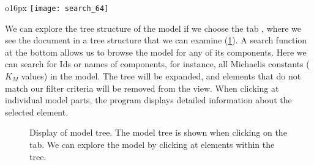 \begin{wrapfigure}{o}{16px}
\texttt{[image: search\_64]}%
\end{wrapfigure}
We can explore the tree structure of the model if we choose the tab , where we see the \SBML document in a tree structure that we can examine (\cref{fig:modelTree}).
A search function at the bottom allows us to browse the model for any of its components.
Here we can search for \acp{Id} or names of components, for instance, all Michaelis constants ($K_M$ values) in the model.
The tree will be expanded, and elements that do not match our filter criteria will be removed from the view.
When clicking at individual model parts, the program displays detailed information about the selected element.
\begin{figure}[t]
\centering
{}
\caption[Display of model tree]{Display of model tree.
The model tree is shown when clicking on the  tab.
We can explore the model by clicking at elements within the tree.}
\label{fig:modelTree}
\end{figure}


